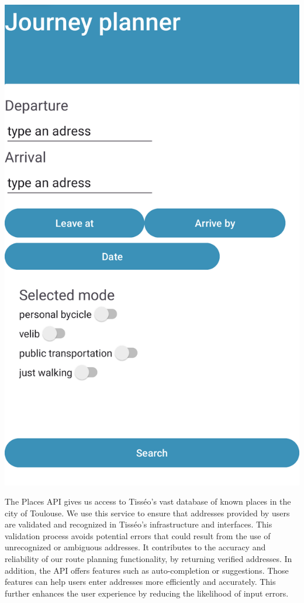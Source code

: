 \begin{center}
\includegraphics[scale=0.15]{content/journey-settings-cut.png}    
\end{center}



The Places API gives us access to Tisséo's vast database of known places in the city of Toulouse. We use this service to ensure that addresses provided by users are validated and recognized in Tisséo's infrastructure and interfaces. This validation process avoids potential errors that could result from the use of unrecognized or ambiguous addresses. It contributes to the accuracy and reliability of our route planning functionality, by returning verified addresses.
In addition, the API offers features such as auto-completion or suggestions. Those features can help users enter addresses more efficiently and accurately. This further enhances the user experience by reducing the likelihood of input errors.



